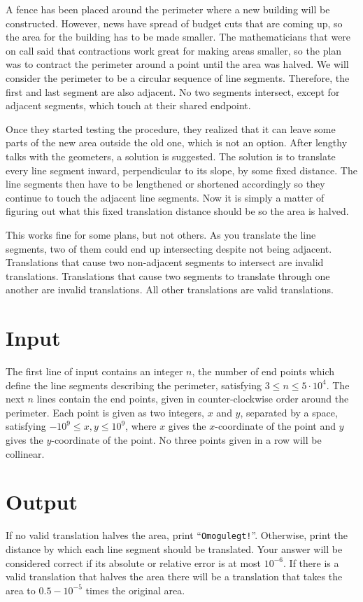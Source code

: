 
A fence has been placed around the perimeter where a new building will be constructed.
However, news have spread of budget cuts that are coming up, so the area for the building has to be made smaller. The mathematicians that were on call said that contractions work great for making areas smaller,
so the plan was to contract the perimeter around a point until the area was halved.
We will consider the perimeter to be a circular sequence of line segments.
Therefore, the first and last segment are also adjacent.
No two segments intersect, except for adjacent segments, which touch at their shared endpoint.

Once they started testing the procedure, they realized that it can leave some parts of the new area outside the old one, which is not an option.
After lengthy talks with the geometers, a solution is suggested.
The solution is to translate every line segment inward, perpendicular to its slope, by some fixed distance.
The line segments then have to be lengthened or shortened accordingly so they continue to touch the adjacent line segments.
Now it is simply a matter of figuring out what this fixed translation distance should be so the area is halved.

This works fine for some plans, but not others.
As you translate the line segments, two of them could end up intersecting despite not being adjacent.
Translations that cause two non-adjacent segments to intersect are invalid translations.
Translations that cause two segments to translate through one another are invalid translations.
All other translations are valid translations.

\section*{Input}
The first line of input contains an integer $n$, the number of end points which define the line segments describing the perimeter, satisfying $3 \leq n \leq 5 \cdot 10^4$.
The next $n$ lines contain the end points, given in counter-clockwise order around the perimeter.
Each point is given as two integers, $x$ and $y$, separated by a space, satisfying $-10^9 \leq x, y \leq 10^9$,
where $x$ gives the $x$-coordinate of the point and $y$ gives the $y$-coordinate of the point.
No three points given in a row will be collinear.

\section*{Output}
If no valid translation halves the area, print ``\texttt{Omogulegt!}''.
Otherwise, print the distance by which each line segment should be translated.
Your answer will be considered correct if its absolute or relative error is at most $10^{-6}$.
If there is a valid translation that halves the area there will be a translation that takes the area
to $0.5 - 10^{-5}$ times the original area.

